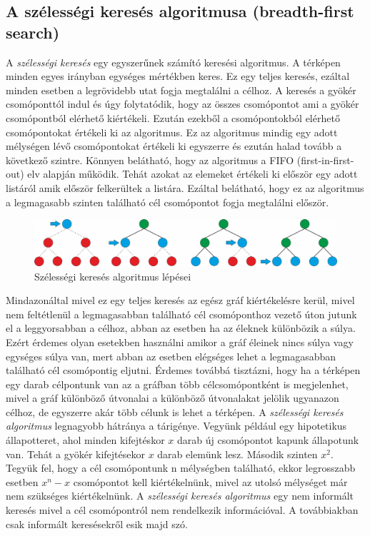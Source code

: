 \subsection{A szélességi keresés algoritmusa (breadth-first search)}
A \textit{szélességi keresés} egy egyszerűnek számító keresési algoritmus. A térképen minden egyes irányban egységes mértékben keres. Ez egy teljes keresés, ezáltal minden esetben a legrövidebb utat fogja megtalálni a célhoz. A keresés a gyökér csomóponttól indul és úgy folytatódik, hogy az összes csomópontot ami a gyökér csomópontból elérhető kiértékeli. Ezután ezekből a csomópontokból elérhető csomópontokat értékeli ki az algoritmus. Ez az algoritmus mindig egy adott mélységen lévő csomópontokat értékeli ki egyszerre és ezután halad tovább a következő szintre. Könnyen belátható, hogy az algoritmus a FIFO (first-in-first-out) elv alapján működik. Tehát azokat az elemeket értékeli ki először egy adott listáról amik először felkerültek a listára. Ezáltal belátható, hogy ez az algoritmus a legmagasabb szinten található cél csomópontot fogja megtalálni először. 

\begin{figure}[h!]
\centering
\includegraphics[scale=0.4]{kepek/breadth-first_search.jpg}
\caption{Szélességi keresés algoritmus lépései}
\label{fig:breadth-first_search}
\end{figure}

\noindent Mindazonáltal mivel ez egy teljes keresés az egész gráf kiértékelésre kerül, mivel nem feltétlenül a legmagasabban található cél csomóponthoz vezető úton jutunk el a leggyorsabban a célhoz, abban az esetben ha az éleknek különbözik a súlya. Ezért érdemes olyan esetekben használni amikor a gráf éleinek nincs súlya vagy egységes súlya van, mert abban az esetben elégséges lehet a legmagasabban található cél csomópontig eljutni.  Érdemes továbbá tisztázni, hogy ha a térképen egy darab célpontunk van az a gráfban több célcsomópontként is megjelenhet, mivel a gráf különböző útvonalai a különböző útvonalakat jelölik ugyanazon célhoz, de egyszerre akár több célunk is lehet a térképen.
\newline
\newline A \textit{szélességi keresés algoritmus} legnagyobb hátránya a tárigénye. Vegyünk például egy hipotetikus állapotteret, ahol minden kifejtéskor $x$ darab új csomópontot kapunk állapotunk van. Tehát a gyökér kifejtésekor $x$ darab elemünk lesz. Második szinten $x^2$. Tegyük fel, hogy a cél csomópontunk n mélységben található, ekkor legrosszabb esetben $x^n - x$ csomópontot kell kiértékelnünk, mivel az utolsó mélységet már nem szükséges kiértékelnünk. 
\newline
\newline A \textit{szélességi keresés algoritmus} egy nem informált keresés mivel a cél csomópontról nem rendelkezik információval. A továbbiakban csak informált keresésekről esik majd szó.

